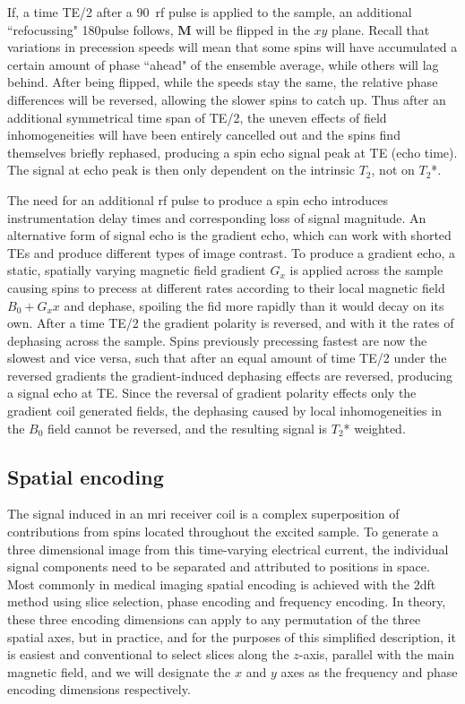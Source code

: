 If, a time TE/2 after a 90\textdegree\ \gls{rf} pulse is applied to the sample, an additional ``refocussing" 180\textdegree pulse follows, $\textbf{M}$ will be flipped in the $xy$ plane.
Recall that variations in precession speeds will mean that some spins will have accumulated a certain amount of phase ``ahead" of the ensemble average, while others will lag behind.
After being flipped, while the speeds stay the same, the relative phase differences will be reversed, allowing the slower spins to catch up.
Thus after an additional symmetrical time span of TE/2, the uneven effects of field inhomogeneities will have been entirely cancelled out and the spins find themselves briefly rephased, producing a spin echo signal peak at TE (echo time).
The signal at echo peak is then only dependent on the intrinsic $T_2$, not on $T_2$*.

The need for an additional \gls{rf} pulse to produce a spin echo introduces instrumentation delay times and corresponding loss of signal magnitude.
An alternative form of signal echo is the gradient echo, which can work with shorted TEs and produce different types of image contrast.
To produce a gradient echo, a static, spatially varying magnetic field gradient $G_x$ is applied across the sample causing spins to precess at different rates according to their local magnetic field $B_0 + G_xx$ and dephase, spoiling the \gls{fid} more rapidly than it would decay on its own.
After a time TE/2 the gradient polarity is reversed, and with it the rates of dephasing across the sample.
Spins previously precessing fastest are now the slowest and vice versa, such that after an equal amount of time TE/2 under the reversed gradients the gradient-induced dephasing effects are reversed, producing a signal echo at TE.
Since the reversal of gradient polarity effects only the gradient coil generated fields, the dephasing caused by local inhomogeneities in the $B_0$ field cannot be reversed, and the resulting signal is $T_2$* weighted.

\subsection{Spatial encoding}

The signal induced in an \gls{mri} receiver coil is a complex superposition of contributions from spins located throughout the excited sample.
To generate a three dimensional image from this time-varying electrical current, the individual signal components need to be separated and attributed to positions in space.
Most commonly in medical imaging spatial encoding is achieved with the \gls{2dft} method using slice selection, phase encoding and frequency encoding.\autocite{Hendee2002}
In theory, these three encoding dimensions can apply to any permutation of the three spatial axes, but in practice, and for the purposes of this simplified description, it is easiest and conventional to select slices along the $z$-axis, parallel with the main magnetic field, and we will designate the $x$ and $y$ axes as the frequency and phase encoding dimensions respectively.

